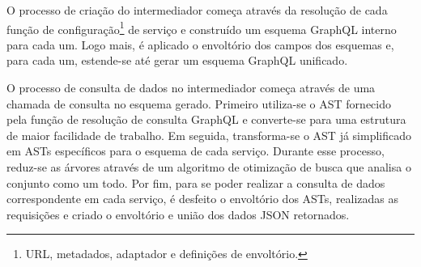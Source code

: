 O processo de criação do intermediador começa através da resolução de cada função de configuração\footnote{
  URL, metadados, adaptador e definições de envoltório.
} de serviço e construído um esquema GraphQL interno para cada um. Logo mais, é aplicado o envoltório dos campos dos esquemas e, para cada um, estende-se até gerar um esquema GraphQL unificado.

O processo de consulta de dados no intermediador começa através de uma chamada de consulta no esquema gerado. Primeiro utiliza-se o AST fornecido pela função de resolução de consulta GraphQL e converte-se para uma estrutura de maior facilidade de trabalho. Em seguida, transforma-se o AST já simplificado em ASTs específicos para o esquema de cada serviço. Durante esse processo, reduz-se as árvores através de um algoritmo de otimização de busca que analisa o conjunto como um todo. Por fim, para se poder realizar a consulta de dados correspondente em cada serviço, é desfeito o envoltório dos ASTs, realizadas as requisições e criado o envoltório e união dos dados JSON retornados. \\
